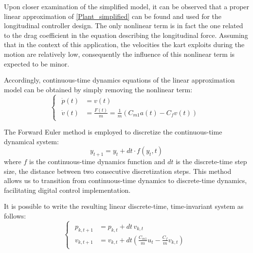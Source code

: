 \documentclass[a4paper,12pt,oneside]{book}
\begin{document}
\bigskip
Upon closer examination of the simplified model, it can be observed that a proper linear approximation of \eqref{Plant_simplified} can be found and used for the longitudinal controller design. 
The only nonlinear term is in fact the one related to the drag coefficient in the equation describing the longitudinal force.
Assuming that in the context of this application, the velocities the kart exploits during the motion are relatively low, consequently the influence of this nonlinear term is expected to be minor.

Accordingly, continuous-time dynamics equations of the linear approximation model can be obtained by simply removing the nonlinear term:
\begin{equation}
\begin{cases}
 	\begin{aligned}
		\dot{p}(t) &= v(t) \\
		\dot{v}(t) &= \frac{F(t)}{m} = \frac{1}{m} (C_{m1} a(t) - C_f v(t) )
	\end{aligned}
\end{cases}
\label{CT_Linear_dynamics}
\end{equation}

\bigskip
The Forward Euler method is employed to discretize the continuous-time dynamical system:
\begin{equation}
    y_{t+1} = y_t + dt \cdot f(y_t, t) 
\end{equation}
where $f$ is the continuous-time dynamics function and $dt$ is the discrete-time step size, the distance between two consecutive discretization steps.
This method allows us to transition from continuous-time dynamics to discrete-time dynamics, facilitating digital control implementation.

It is possible to write the resulting linear discrete-time, time-invariant system as follows:
\begin{equation}
\begin{cases}
	\begin{aligned}
		p_{k,t+1} &= p_{k,t} + dt \, v_{k,t} \\
		v_{k,t+1} &= v_{k,t} + dt \left( \frac{C_{m1}}{m} u_t - \frac{C_f}{m} v_{k,t}  \right)
	\end{aligned}
\end{cases}
\end{equation}
\end{document}
